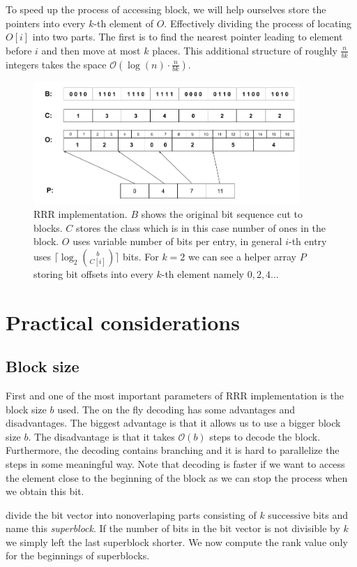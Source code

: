 To speed up the process of accessing block, we will help ourselves
store the pointers into every
$k$-th element of $O$. Effectively dividing the process of locating $O[i]$ into two
parts. The first is to find the nearest pointer leading to element before $i$ and
then move at most $k$ places. This additional structure of roughly $\frac{n}{bk}$ integers
takes the space $\mathcal{O}(\log(n)\cdot \frac{n}{bk})$.

\begin{figure}
	\centerline{
		\includegraphics[width=0.9\textwidth, height=0.3\textheight]{images/rrr}
	}
	\caption[TODO]{RRR implementation. $B$ shows the original bit sequence cut to
    blocks. $C$ stores the class which is in this case number of ones in the block.
    $O$ uses variable number of bits per entry, in general $i$-th entry uses
    $\lceil \log_2{b\choose C[i]}\rceil$ bits. For $k=2$ we can see a helper array $P$
    storing bit offsets into every $k$-th element namely $0, 2, 4\ldots$
	}
	\label{obr:RRRFinal}
\end{figure}

\section{Practical considerations}

\subsection{Block size}

First and one of the most important parameters of RRR implementation is the block
size $b$ used. The on the fly decoding has some advantages and disadvantages. The
biggest advantage is that it allows us to use a bigger block size $b$. The disadvantage
is that it takes $\mathcal{O}(b)$ steps to decode the block. Furthermore, the decoding
contains branching and it is hard to parallelize the steps in some meaningful way.
Note that decoding is faster if we want to access the element close to the beginning of
the block as we can stop the process when we obtain this bit.


divide the bit vector into nonoverlaping parts consisting of $k$
successive bits and name this \textit{superblock}. If the number of bits in the bit vector
is not divisible by $k$ we simply left the last superblock shorter. We now compute the rank
value only for the beginnings of superblocks.